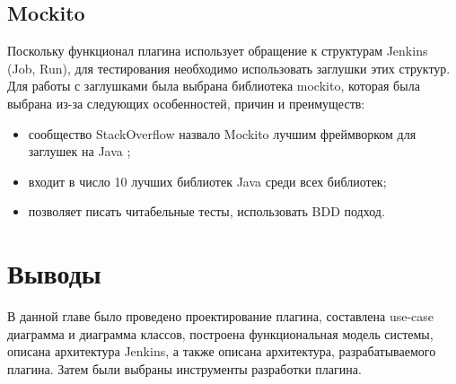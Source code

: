 \subsection{Mockito}

Поскольку функционал плагина использует обращение к структурам Jenkins (Job, Run), для тестирования необходимо использовать заглушки этих структур. Для работы с заглушками была выбрана библиотека mockito, которая была выбрана из-за следующих особенностей, причин и преимуществ:

\begin{itemize}
	\item сообщество StackOverflow назвало Mockito лучшим фреймворком для заглушек на Java \cite{mockito};
	\item входит в число 10 лучших библиотек Java среди всех библиотек;
	\item позволяет писать читабельные тесты, использовать BDD подход.
\end{itemize}

\section{Выводы} \label{ch1:sec7}

В данной главе было проведено проектирование плагина, составлена use-case диаграмма и диаграмма классов, построена функциональная модель системы, описана архитектура Jenkins, а также описана архитектура, разрабатываемого плагина. Затем были выбраны инструменты разработки плагина.


%
